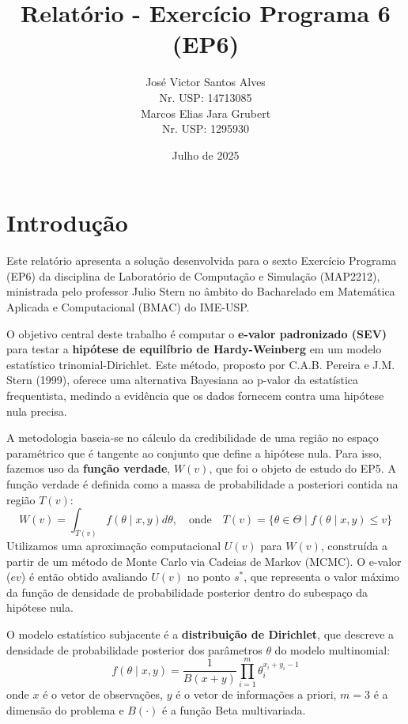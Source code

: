 \documentclass[12pt, a4paper]{article}
\title{Relatório - Exercício Programa 6 (EP6)}
\author{José Victor Santos Alves \\ Nr. USP: 14713085 \\ Marcos Elias Jara Grubert\\ Nr. USP: 1295930}
\date{Julho de 2025}
\begin{document}
\maketitle

\section{Introdução }

Este relatório apresenta a solução desenvolvida para o sexto Exercício Programa (EP6) da disciplina de Laboratório de Computação e Simulação (MAP2212), ministrada pelo professor Julio Stern no âmbito do Bacharelado em Matemática Aplicada e Computacional (BMAC) do IME-USP.

O objetivo central deste trabalho é computar o \textbf{e-valor padronizado (SEV)} para testar a \textbf{hipótese de equilíbrio de Hardy-Weinberg} em um modelo estatístico trinomial-Dirichlet. Este método, proposto por C.A.B. Pereira e J.M. Stern (1999), oferece uma alternativa Bayesiana ao p-valor da estatística frequentista, medindo a evidência que os dados fornecem contra uma hipótese nula precisa.

A metodologia baseia-se no cálculo da credibilidade de uma região no espaço paramétrico que é tangente ao conjunto que define a hipótese nula. Para isso, fazemos uso da \textbf{função verdade}, $W(v)$, que foi o objeto de estudo do EP5. A função verdade é definida como a massa de probabilidade a posteriori contida na região $T(v)$:
\begin{equation}
    W(v) = \int_{T(v)} f(\theta\mid x,y)d\theta, \quad \text{onde} \quad T(v)=\{ \theta \in \Theta \mid f(\theta\mid x,y)\leq v\}
\end{equation}
Utilizamos uma aproximação computacional $U(v)$ para $W(v)$, construída a partir de um método de Monte Carlo via Cadeias de Markov (MCMC). O e-valor ($ev$) é então obtido avaliando $U(v)$ no ponto $s^*$, que representa o valor máximo da função de densidade de probabilidade posterior dentro do subespaço da hipótese nula.

O modelo estatístico subjacente é a \textbf{distribuição de Dirichlet}, que descreve a densidade de probabilidade posterior dos parâmetros $\theta$ do modelo multinomial:
\begin{equation}
    f(\theta\mid x,y) =  \frac{1}{B(x+y)}  \prod_{i=1}^m  \theta_i^{x_i+y_i-1} 
\end{equation}
onde $x$ é o vetor de observações, $y$ é o vetor de informações a priori, $m=3$ é a dimensão do problema e $B(\cdot)$ é a função Beta multivariada.
\end{document}
